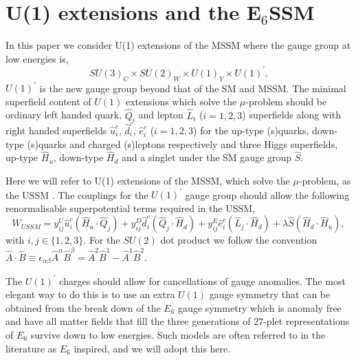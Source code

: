 \documentclass[preprint,amsmath,amssymb,aps,superscriptaddress,prd,showpacs,floatfix,nofootinbib]{revtex4-1}
\newcommand{\be}{\begin{equation}}
\newcommand{\ee}{\end{equation}}
\begin{document}
\section{\label{sec:model}U(1) extensions and the E$_6$SSM}
In this paper we consider U(1) extensions of the MSSM where the gauge
group at low energies is, \be SU(3)_C\times SU(2)_W\times U(1)_Y\times
U(1)^\prime. \ee $U(1)^\prime$ is the new gauge group beyond
that of the SM and MSSM. The minimal superfield content of $U(1)$
extensions which solve the $\mu$-problem should be ordinary left
handed quark, $\hat{Q}_i$ and lepton $\hat{L}_i$
($i=1,2,3$) superfields along with right handed superfields
$\hat{u}^c_i$, $\hat{d}^c_i$, $\hat{e}^c_i$ ($i=1,2,3$) for the
up-type (s)quarks, down-type (s)quarks and charged (s)leptons
respectively and three Higgs superfields, up-type $\hat{H}_u$,
down-type $\hat{H}_d$ and a singlet under the SM gauge group
$\hat{S}$.


Here we will refer to U(1) extensions of the MSSM, which solve the
$\mu$-problem, as the USSM \cite{Cvetic:1995rj, Jain:1995cb,
  Nir:1995bu, Cvetic:1996mf, Cvetic:1997ky}.  The couplings for the
$U(1)^\prime$ gauge group should allow the following renormalisable
superpotential terms required in the USSM, \be W_{USSM} = y^U_{ij}
\hat{u}^c_i \left ( \hat{H}_u \cdot \hat{Q}_j \right ) + y^D_{ij} \hat{d}^c_i 
\left ( \hat{Q}_j \cdot \hat{H}_d \right )
 + y^E_{ij} \hat{e}^c_i \left ( \hat{L}_j \cdot \hat{H}_d \right ) + \lambda \hat{S}
\left ( \hat{H}_d \cdot \hat{H}_u \right ), \ee with $i,j \in \{1,2,3\}$. 
For the $SU(2)$ dot product we follow the convention $\hat{A}\cdot \hat{B}\equiv \epsilon_{\alpha\beta}\hat{A}^\alpha\hat{B}^\beta=\hat{A}^2\hat{B}^1-\hat{A}^1\hat{B}^2$.


The $U(1)^\prime$ charges should allow for cancellations of gauge
anomalies.  The most elegant way to do this is to use an extra $U(1)$
gauge symmetry that can be obtained from the break down of the $E_6$
gauge symmetry which is anomaly free and have all matter fields that fill the
three generations of $27$-plet representations of $E_6$ survive down to
low energies.  Such models are often referred to in the literature as
$E_6$ inspired, and we will adopt this here.
\end{document}
